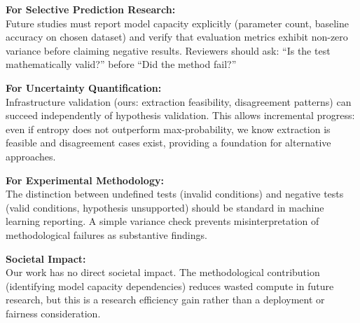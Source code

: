 \textbf{For Selective Prediction Research:}\\
Future studies must report model capacity explicitly (parameter count, baseline accuracy on chosen dataset) and verify that evaluation metrics exhibit non-zero variance before claiming negative results. Reviewers should ask: ``Is the test mathematically valid?'' before ``Did the method fail?''

\textbf{For Uncertainty Quantification:}\\
Infrastructure validation (ours: extraction feasibility, disagreement patterns) can succeed independently of hypothesis validation. This allows incremental progress: even if entropy does not outperform max-probability, we know extraction is feasible and disagreement cases exist, providing a foundation for alternative approaches.

\textbf{For Experimental Methodology:}\\
The distinction between undefined tests (invalid conditions) and negative tests (valid conditions, hypothesis unsupported) should be standard in machine learning reporting. A simple variance check prevents misinterpretation of methodological failures as substantive findings.

\textbf{Societal Impact:}\\
Our work has no direct societal impact. The methodological contribution (identifying model capacity dependencies) reduces wasted compute in future research, but this is a research efficiency gain rather than a deployment or fairness consideration.
